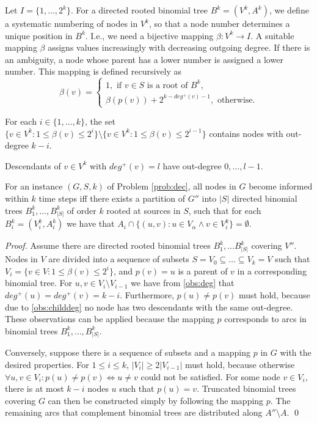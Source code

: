 Let $I=\{1,\dots,2^k\}$.
For a directed rooted binomial tree $B^k=(V^k,A^k)$, we define a systematic numbering of nodes in $V^k$, so that a node number determines a unique position in $B^k$.
I.e., we need a bijective mapping $\beta: V^k \to I$.
A suitable mapping $\beta$ assigns values increasingly with decreasing outgoing degree. 
If there is an ambiguity, a node whose parent has a lower number is assigned a lower number.
This mapping is defined recursively as
\begin{equation}
\label{eq:beta}
\beta(v)=\begin{cases}
1,\text{ if } v\in S \text{ is a root of } B^k,\\
\beta(p(v)) + 2^{k-deg^+(v)-1}, \text{ otherwise}.
\end{cases}
\end{equation}
\begin{observation}\label{obs:deg}
For each $i\in\{1,\dots,k\}$, the set $\{v\in V^k: 1\leq\beta(v)\leq2^i\}\setminus\{v\in V^k:1\leq\beta(v)\leq2^{i-1}\}$ contains nodes with out-degree $k-i$.
\end{observation}
\begin{observation}\label{obs:childdeg}
Descendants of $v\in V^k$ with $deg^+(v)=l$ have out-degree $0,\dots,l-1$.
\end{observation}
\begin{proposition}\label{lem:probeq}
For an instance $(G,S,k)$ of Problem \ref{prob:dec}, all nodes in $G$ become informed within $k$ time steps iff 
there exists a partition of $G''$ into $|S|$ directed binomial trees $B^k_1,\dots,B^k_{|S|}$ of order $k$ rooted at sources in $S$,
such that for each $B^k_i=(V^k_i,A^k_i)$ we have that $A_i\cap\{(u,v):u \in V_\alpha \wedge v\in V^k_i\}=\emptyset$. 
\end{proposition}
\begin{proof}
Assume there are directed rooted binomial trees $B^k_1,\dots B^k_{|S|}$ covering $V''$. 
Nodes in $V$ are divided into a sequence of subsets $S=V_0\subseteq\dots\subseteq V_k=V$ such that $V_i=\{v\in V:1\leq\beta(v)\leq 2^i\}$,
and $p(v)=u$ is a parent of $v$ in a corresponding binomial tree.
For $u,v\in V_i\setminus V_{i-1}$ we have from \ref{obs:deg} that $deg^+(u)=deg^+(v)=k-i$.
Furthermore, $p(u)\neq p(v)$ must hold, because due to \ref{obs:childdeg} no node has two descendants with the same out-degree.
These observations can be applied because the mapping $p$ corresponds to arcs in binomial trees $B^k_1,\dots,B^k_{|S|}$. 

Conversely, suppose there is a sequence of subsets and a mapping $p$ in $G$ with the desired properties.
For $1\leq i\leq k$, $|V_i|\geq2|V_{i-1}|$ must hold, because otherwise $\forall u,v\in V_i:p(u)\neq p(v)\Leftrightarrow u\neq v$ could not be satisfied.
For some node $v\in V_i$, there is at most $k-i$ nodes $u$ such that $p(u)=v$.
Truncated binomial trees covering $G$ can then be constructed simply by following the mapping $p$.
The remaining arcs that complement binomial trees are distributed along $A''\setminus A$.
\qed
\end{proof}

